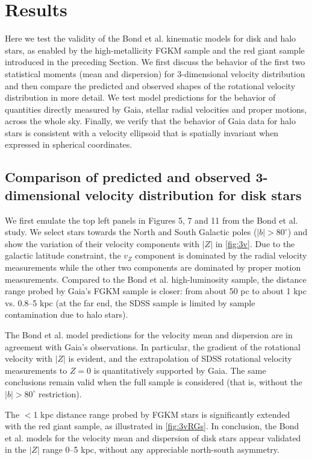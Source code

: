 

\section{Results\label{sec:results}}

Here we test the validity of the Bond et al. kinematic models for disk and halo stars, as enabled by the high-metallicity FGKM sample
and the red giant sample introduced in the preceding Section.
We first discuss the behavior of the first two statistical moments (mean and dispersion) for 3-dimensional velocity distribution
and then compare the predicted and observed shapes of the rotational velocity distribution in more detail. We test
model predictions for the behavior of quantities directly measured by Gaia, stellar radial velocities and proper motions, across
the whole sky. Finally, we verify that the behavior of Gaia data for halo stars is consistent with a velocity ellipsoid that is
spatially invariant when expressed in spherical coordinates. 


\subsection{Comparison of predicted and observed 3-dimensional velocity distribution for disk stars}

We first emulate the top left panels in Figures 5, 7 and 11 from the Bond et al. study. We select stars towards the North and South
Galactic poles ($|b|>80^\circ$) and show the variation of their velocity components with $|Z|$ in \autoref{fig:3v}. Due to the
galactic latitude constraint, the $v_Z$ component is dominated by the radial velocity measurements while the other two components
are dominated by proper motion measurements. Compared to the Bond et al. high-luminosity sample, the distance range probed
by Gaia's FGKM sample is closer: from about 50 pc to about 1 kpc vs. 0.8--5 kpc (at the far end, the SDSS sample is limited by
sample contamination due to halo stars).

The Bond et al. model predictions for the velocity mean and dispersion are in agreement with Gaia's observations. In particular, the
gradient of the rotational velocity with $|Z|$ is evident, and the extrapolation of SDSS rotational velocity measurements to $Z=0$
is quantitatively supported by Gaia. The same conclusions remain valid when the full sample is considered (that is, without the $|b|>80^\circ$ restriction).

The $<$1 kpc distance range probed by FGKM stars is significantly extended with the red giant sample, as illustrated in
\autoref{fig:3vRGs}. In conclusion, the Bond et al. models for the velocity mean and dispersion of disk stars appear validated
in the $|Z|$ range 0--5 kpc, without any appreciable north-south asymmetry.  


